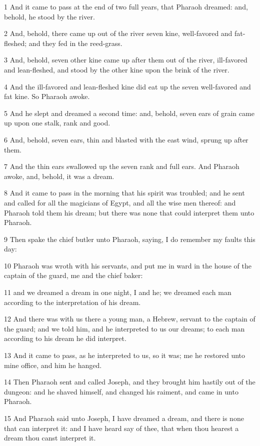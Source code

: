 \par 1 And it came to pass at the end of two full years, that Pharaoh dreamed: and, behold, he stood by the river.
\par 2 And, behold, there came up out of the river seven kine, well-favored and fat-fleshed; and they fed in the reed-grass.
\par 3 And, behold, seven other kine came up after them out of the river, ill-favored and lean-fleshed, and stood by the other kine upon the brink of the river.
\par 4 And the ill-favored and lean-fleshed kine did eat up the seven well-favored and fat kine. So Pharaoh awoke.
\par 5 And he slept and dreamed a second time: and, behold, seven ears of grain came up upon one stalk, rank and good.
\par 6 And, behold, seven ears, thin and blasted with the east wind, sprung up after them.
\par 7 And the thin ears swallowed up the seven rank and full ears. And Pharaoh awoke, and, behold, it was a dream.
\par 8 And it came to pass in the morning that his spirit was troubled; and he sent and called for all the magicians of Egypt, and all the wise men thereof: and Pharaoh told them his dream; but there was none that could interpret them unto Pharaoh.
\par 9 Then spake the chief butler unto Pharaoh, saying, I do remember my faults this day:
\par 10 Pharaoh was wroth with his servants, and put me in ward in the house of the captain of the guard, me and the chief baker:
\par 11 and we dreamed a dream in one night, I and he; we dreamed each man according to the interpretation of his dream.
\par 12 And there was with us there a young man, a Hebrew, servant to the captain of the guard; and we told him, and he interpreted to us our dreams; to each man according to his dream he did interpret.
\par 13 And it came to pass, as he interpreted to us, so it was; me he restored unto mine office, and him he hanged.
\par 14 Then Pharaoh sent and called Joseph, and they brought him hastily out of the dungeon: and he shaved himself, and changed his raiment, and came in unto Pharaoh.
\par 15 And Pharaoh said unto Joseph, I have dreamed a dream, and there is none that can interpret it: and I have heard say of thee, that when thou hearest a dream thou canst interpret it.

